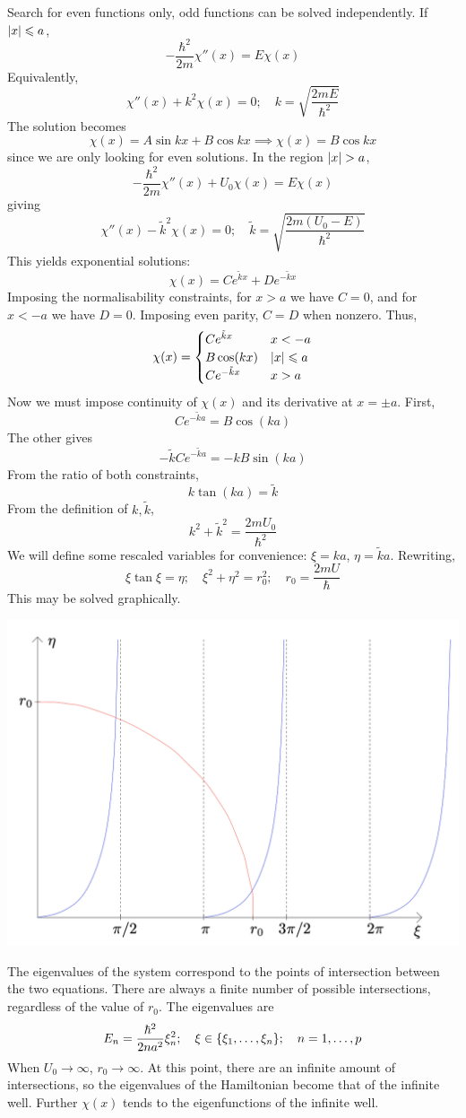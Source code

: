 \documentclass[a4paper,11pt]{article}
\begin{document}
Search for even functions only, odd functions can be solved independently.
If \( \abs{x} \leqslant a \),
\[
	-\frac{\hbar^2}{2m} \chi''(x) = E\chi(x)
\]
Equivalently,
\[
	\chi''(x) + k^2 \chi(x) = 0;\quad k = \sqrt{\frac{2mE}{\hbar^2}}
\]
The solution becomes
\[
	\chi(x) = A \sin kx + B \cos kx \implies \chi(x) = B \cos kx
\]
since we are only looking for even solutions.
In the region \( \abs{x} > a \),
\[
	-\frac{\hbar^2}{2m} \chi''(x) + U_0 \chi(x) = E \chi(x)
\]
giving
\[
	\chi''(x) - \tilde k^2 \chi(x) = 0;\quad \tilde k = \sqrt{\frac{2m(U_0 - E)}{\hbar^2}}
\]
This yields exponential solutions:
\[
	\chi(x) = C e^{\tilde k x} + D e^{-\tilde k x}
\]
Imposing the normalisability constraints, for \( x > a \) we have \( C = 0 \), and for \( x < -a \) we have \( D = 0 \).
Imposing even parity, \( C = D \) when nonzero.
Thus,
\[
	\chi(x) = \begin{cases}
		C e^{\tilde k x}  & x < -a         \\
		B \cos(kx)           & \abs{x} \leqslant a \\
		C e^{-\tilde k x} & x > a
	\end{cases}
\]
Now we must impose continuity of \( \chi(x) \) and its derivative at \( x = \pm a \).
First,
\[
	C e^{-\tilde k a} = B \cos(k a)
\]
The other gives
\[
	-\tilde k C e^{-\tilde k a} = -k B \sin(k a)
\]
From the ratio of both constraints,
\[
	k \tan (ka) = \tilde k
\]
From the definition of \( k, \tilde k \),
\[
	k^2 + \tilde k^2 = \frac{2mU_0}{\hbar^2}
\]
We will define some rescaled variables for convenience: \( \xi = ka \), \( \eta = \tilde k a \).
Rewriting,
\[
	\xi \tan \xi = \eta;\quad \xi^2 + \eta^2 = r_0^2;\quad r_0 = \frac{2mU}{\hbar}
\]
This may be solved graphically.
\begin{center}
    \includegraphics[scale=0.25]{qm7.png}
\end{center}
The eigenvalues of the system correspond to the points of intersection between the two equations.
There are always a finite number of possible intersections, regardless of the value of \( r_0 \).
The eigenvalues are
\[
	E_n = \frac{\hbar^2}{2 n a^2} \xi_n^2;\quad \xi \in \qty{\xi_1, \dots, \xi_n};\quad n = 1, \dots, p
\]
When \( U_0 \to \infty \), \( r_0 \to \infty \).
At this point, there are an infinite amount of intersections, so the eigenvalues of the Hamiltonian become that of the infinite well.
Further \( \chi(x) \) tends to the eigenfunctions of the infinite well.
\end{document}
